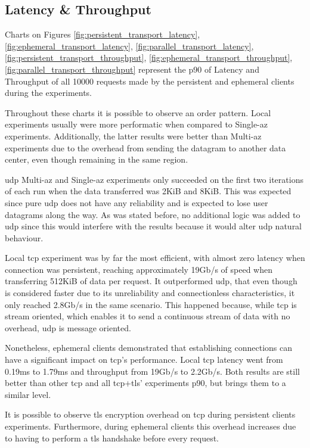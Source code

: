 \subsection{Latency \& Throughput}

Charts on Figures \ref{fig:persistent_transport_latency}, \ref{fig:ephemeral_transport_latency}, \ref{fig:parallel_transport_latency}, \ref{fig:persistent_transport_throughput}, \ref{fig:ephemeral_transport_throughput}, \ref{fig:parallel_transport_throughput} represent the \gls{p90} of Latency and Throughput of all 10000 requests made by the persistent and ephemeral clients during the experiments.

Throughout these charts it is possible to observe an order pattern. Local experiments usually were more performatic when compared to Single-\gls{az} experiments. Additionally, the latter results were better than Multi-\gls{az} experiments due to the overhead from sending the datagram to another data center, even though remaining in the same region.

\gls{udp} Multi-\gls{az} and Single-\gls{az} experiments only succeeded on the first two iterations of each run when the data transferred was 2KiB and 8KiB. This was expected since pure \gls{udp} does not have any reliability and is expected to lose user datagrams along the way. As was stated before, no additional logic was added to \gls{udp} since this would interfere with the results because it would alter \gls{udp} natural behaviour.

Local \gls{tcp} experiment was by far the most efficient, with almost zero latency when connection was persistent, reaching approximately 19Gb/s of speed when transferring 512KiB of data per request. It outperformed \gls{udp}, that even though is considered faster due to its unreliability and connectionless characteristics, it only reached 2.8Gb/s in the same scenario. This happened because, while \gls{tcp} is stream oriented, which enables it to send a continuous stream of data with no overhead, \gls{udp} is message oriented.

Nonetheless, ephemeral clients demonstrated that establishing connections can have a significant impact on \gls{tcp}’s performance. Local \gls{tcp} latency went from 0.19ms to 1.79ms and throughput from 19Gb/s to 2.2Gb/s. Both results are still better than other \gls{tcp} and all \gls{tcp}+\gls{tls}’ experiments \gls{p90}, but brings them to a similar level.

It is possible to observe \gls{tls} encryption overhead on \gls{tcp} during persistent clients experiments. Furthermore, during ephemeral clients this overhead increases due to having to perform a \gls{tls} handshake before every request.

